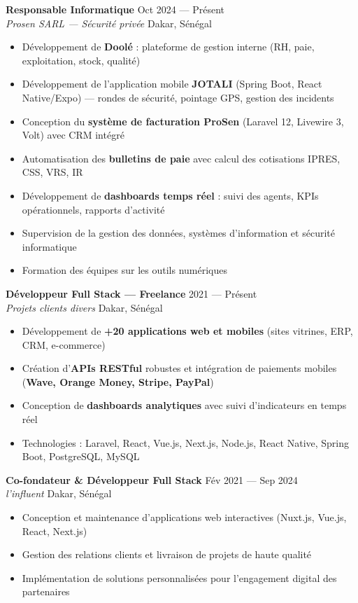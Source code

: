 \documentclass[a4paper,11pt]{article}
\newcommand{\cventry}[4]{
    {\textbf{\color{darktext}#1}} \hfill {\small\color{graytext}#2} \\
    {\color{accent}\textit{#3}} \hfill {\small\color{graytext}#4}
}
\begin{document}
\cventry{Responsable Informatique}{Oct 2024 — Présent}{Prosen SARL — Sécurité privée}{Dakar, Sénégal}
\begin{itemize}[leftmargin=12pt, itemsep=1pt, topsep=3pt]
    \item Développement de \textbf{Doolé} : plateforme de gestion interne (RH, paie, exploitation, stock, qualité)
    \item Développement de l'application mobile \textbf{JOTALI} (Spring Boot, React Native/Expo) — rondes de sécurité, pointage GPS, gestion des incidents
    \item Conception du \textbf{système de facturation ProSen} (Laravel 12, Livewire 3, Volt) avec CRM intégré
    \item Automatisation des \textbf{bulletins de paie} avec calcul des cotisations IPRES, CSS, VRS, IR
    \item Développement de \textbf{dashboards temps réel} : suivi des agents, KPIs opérationnels, rapports d'activité
    \item Supervision de la gestion des données, systèmes d'information et sécurité informatique
    \item Formation des équipes sur les outils numériques
\end{itemize}

\vspace{4pt}

\cventry{Développeur Full Stack — Freelance}{2021 — Présent}{Projets clients divers}{Dakar, Sénégal}
\begin{itemize}[leftmargin=12pt, itemsep=1pt, topsep=3pt]
    \item Développement de \textbf{+20 applications web et mobiles} (sites vitrines, ERP, CRM, e-commerce)
    \item Création d'\textbf{APIs RESTful} robustes et intégration de paiements mobiles (\textbf{Wave, Orange Money, Stripe, PayPal})
    \item Conception de \textbf{dashboards analytiques} avec suivi d'indicateurs en temps réel
    \item Technologies : Laravel, React, Vue.js, Next.js, Node.js, React Native, Spring Boot, PostgreSQL, MySQL
\end{itemize}

\vspace{4pt}

\cventry{Co-fondateur \& Développeur Full Stack}{Fév 2021 — Sep 2024}{l'influent}{Dakar, Sénégal}
\begin{itemize}[leftmargin=12pt, itemsep=1pt, topsep=3pt]
    \item Conception et maintenance d'applications web interactives (Nuxt.js, Vue.js, React, Next.js)
    \item Gestion des relations clients et livraison de projets de haute qualité
    \item Implémentation de solutions personnalisées pour l'engagement digital des partenaires
\end{itemize}
\end{document}
